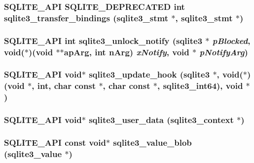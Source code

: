 \subsubsection{\setlength{\rightskip}{0pt plus 5cm}SQLITE\_\-API SQLITE\_\-DEPRECATED int sqlite3\_\-transfer\_\-bindings (\bf{sqlite3\_\-stmt} $\ast$, \bf{sqlite3\_\-stmt} $\ast$)}\label{sqlite3_8h_1ed7bbeb7f199d6ac803dbdeb504e559}


\subsubsection{\setlength{\rightskip}{0pt plus 5cm}SQLITE\_\-API int sqlite3\_\-unlock\_\-notify (\bf{sqlite3} $\ast$ {\em p\-Blocked}, void($\ast$)(void $\ast$$\ast$ap\-Arg, int n\-Arg) {\em x\-Notify}, void $\ast$ {\em p\-Notify\-Arg})}\label{sqlite3_8h_bf46814e2d65cfd4eb3857e0468cb365}


\subsubsection{\setlength{\rightskip}{0pt plus 5cm}SQLITE\_\-API void$\ast$ sqlite3\_\-update\_\-hook (\bf{sqlite3} $\ast$, void($\ast$)(void $\ast$, int, char const $\ast$, char const $\ast$, \bf{sqlite3\_\-int64}), void $\ast$)}\label{sqlite3_8h_0cf411c582caddc0f5d68bf638f6b61d}


\subsubsection{\setlength{\rightskip}{0pt plus 5cm}SQLITE\_\-API void$\ast$ sqlite3\_\-user\_\-data (\bf{sqlite3\_\-context} $\ast$)}\label{sqlite3_8h_55838188d91e46dc41487b322dd0359d}


\subsubsection{\setlength{\rightskip}{0pt plus 5cm}SQLITE\_\-API const void$\ast$ sqlite3\_\-value\_\-blob (\bf{sqlite3\_\-value} $\ast$)}\label{sqlite3_8h_efd6de9ddb5717a0aaf8d9ad8a546486}


